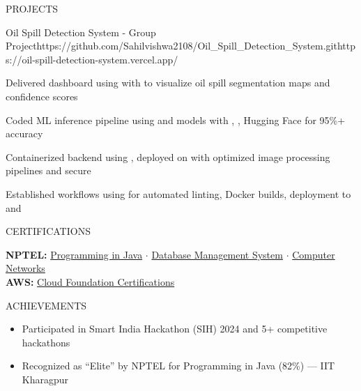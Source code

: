 \documentclass{resume}
\begin{document}
\begin{rSection}{PROJECTS}
\begin{rProject}{Oil Spill Detection System - Group Project}{https://github.com/Sahilvishwa2108/Oil_Spill_Detection_System.git}{https://oil-spill-detection-system.vercel.app/}
\item Delivered dashboard using  with  to visualize oil spill segmentation maps and confidence scores
\item Coded ML inference pipeline using  and  models with , , Hugging Face for 95\%+ accuracy
\item Containerized backend using , deployed on  with optimized image processing pipelines and secure 
\item Established  workflows using  for automated linting, Docker builds, deployment to  and 
\end{rProject}

\end{rSection}

\begin{rSection}{CERTIFICATIONS}

\textbf{NPTEL:} \href{https://archive.nptel.ac.in/content/noc/NOC25/SEM1/Ecertificates/106/noc25-cs57/Course/NPTEL25CS57S124280252304432710.pdf}{Programming in Java} $\cdot$ \href{https://archive.nptel.ac.in/content/noc/NOC25/SEM1/Ecertificates/106/noc25-cs18/Course/NPTEL25CS18S53880028401363129.pdf}{Database Management System} $\cdot$ \href{https://archive.nptel.ac.in/content/noc/NOC25/SEM1/Ecertificates/106/noc25-cs57/Course/NPTEL25CS57S124232710.pdf}{Computer Networks} \\[1pt]
\textbf{AWS:} \href{https://archive.aws.ac.in/content/noc/NOC25/SEM1/Ecertificates/106/noc25-cs18/Course/AWS25CS18S53880028401363129.pdf}{Cloud Foundation Certifications}

\end{rSection}

\begin{rSection}{ACHIEVEMENTS}

\begin{itemize}[leftmargin=12pt, itemsep=0pt, label={\small$\bullet$}]
\item Participated in Smart India Hackathon (SIH) 2024 and 5+ competitive hackathons
\item Recognized as ``Elite'' by NPTEL for Programming in Java (82\%) — IIT Kharagpur
\end{itemize}

\end{rSection}
\end{document}

